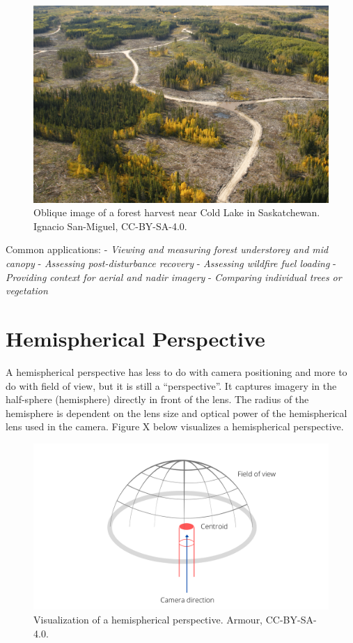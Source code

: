 \documentclass[
]{book}
\begin{document}
\begin{figure}
\includegraphics[width=0.9\linewidth]{images/12-oblique-image} \caption{Oblique image of a forest harvest near Cold Lake in Saskatchewan. Ignacio San-Miguel, CC-BY-SA-4.0.}\label{fig:12-oblique-image}
\end{figure}

Common applications:
- \emph{Viewing and measuring forest understorey and mid canopy}
- \emph{Assessing post-disturbance recovery}
- \emph{Assessing wildfire fuel loading}
- \emph{Providing context for aerial and nadir imagery}
- \emph{Comparing individual trees or vegetation}

\section{Hemispherical Perspective}\label{hemispherical-perspective}

A hemispherical perspective has less to do with camera positioning and more to do with field of view, but it is still a ``perspective''. It captures imagery in the half-sphere (hemisphere) directly in front of the lens. The radius of the hemisphere is dependent on the lens size and optical power of the hemispherical lens used in the camera. Figure X below visualizes a hemispherical perspective.

\begin{figure}
\includegraphics[width=0.9\linewidth]{images/12-hemisphere-view} \caption{Visualization of a hemispherical perspective. Armour, CC-BY-SA-4.0.}\label{fig:12-hemisphere-view}
\end{figure}
\end{document}
